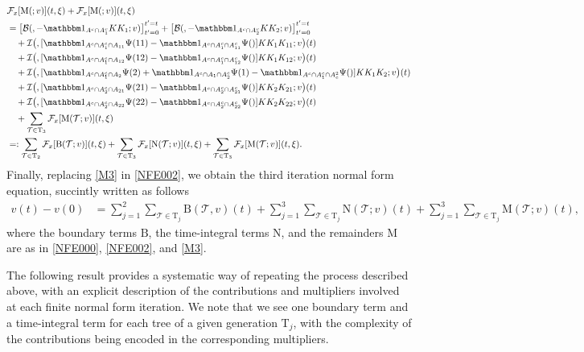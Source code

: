 \documentclass[%
11pt,  reqno]{amsart}
\makeatletter
\newcommand{\5}{\textup{V}}
\newcommand{\ind}{\mathbbm 1}
\theoremstyle{remark}
\newcommand{\TT}{\mathcal{T}}
\newcommand{\Tr}{\mathrm{T}}
\newcommand{\Ft}{{\mathcal{F}}}
\def\<#1>{\csname MH@symb@#1\endcsname}
\newcommand{\B}{\mathcal{B}}
\newcommand{\Ical}{\mathcal{I}}
\numberwithin{equation}{section}
\numberwithin{theorem}{section}
\newcommand{\MM}{\mathrm{M}}
\newcommand{\NN}{\mathrm{N}}
\newcommand{\BB}{\mathrm{B}}
\makeatother
\begin{document}
\begin{align}
&
 \Ft_x[ 
\MM(\<21>;v)
] (t, \xi) 
+
 \Ft_x[ 
\MM(\<22>;v)
] (t, \xi) 
\\
&
=
\big[ \B(\<21>, - \ind_{A^c \cap A_1^c} KK_1 ; v) \big]_{t'=0}^{t'=t}
+
\big[ \B(\<22>, - \ind_{A^c \cap A_2^c} KK_2 ; v) \big]_{t'=0}^{t'=t}
\\
&
\quad 
+ \Ical\big( \<31> ,  [\ind_{A^c\cap A_1^c \cap A_{11}} \Psi(11) - \ind_{A^c\cap A_1^c \cap A_{11}^c} \Psi(\<21>) ] KK_1 K_{11}  ; v \big)(t)
\\
&
\quad 
+
 \Ical\big( \<32> , [ \ind_{A^c\cap A_1^c \cap A_{12}} \Psi(12) - \ind_{A^c \cap A_1^c \cap A_{12}^c} \Psi(\<21>)  ]KK_1 K_{12}  ; v \big)(t)
\\
&
\quad 
+ \Ical\big( \<33> ,  [ \ind_{A^c\cap A_1^c \cap A_{2}} \Psi(2)+ \ind_{A^c \cap A_1 \cap A_2^c} \Psi(1)  - \ind_{A^c \cap A_1^c \cap A^2_c} \Psi(\<1>)] KK_1 K_2    ; v \big)(t)
\\
&
\quad 
+ \Ical\big( \<34> , [ \ind_{A^c \cap A_2^c \cap A_{21}} \Psi(21) - \ind_{A^c \cap A_2^c \cap A_{21}^c} \Psi(\<22>) ]K K_2 K_{21}  ; v \big)(t)
\\
&
\quad 
+ \Ical\big( \<35> ,[ \ind_{A^c \cap A_2^c \cap A_{22} } \Psi(22) - \ind_{A^c \cap A_2^c \cap A_{22}^c} \Psi(\<22>) ] K K_2 K_{22}    ; v \big)(t)
\\
&
\quad 
+ \sum_{\TT\in\Tr_3} 
 \Ft_x[ 
\MM(\TT;v)
] (t, \xi) 
\\
&
=: 
\sum_{\TT\in \Tr_2}  
\Ft_x[ 
\BB(\TT;v)
] (t, \xi) 
 + \sum_{\TT \in \Tr_3} 
 \Ft_x[ 
\NN(\TT;v)
] (t, \xi) 
 + \sum_{\TT\in\Tr_3} 
 \Ft_x[ 
\MM(\TT;v)
] (t, \xi) 
. 
\label{M3}
\end{align}
Finally, replacing \eqref{M3} in \eqref{NFE002}, we obtain the third iteration normal form equation, succintly written as follows
\begin{align}
v(t) - v(0)
&
= \sum_{j=1}^2 \sum_{\TT \in \Tr_j} \BB(\TT,v)(t) 
+ 
\sum_{j=1}^3 \sum_{\TT\in \Tr_j} \NN(\TT; v) (t)
+
\sum_{j=1}^3 \sum_{\TT\in \Tr_j} \MM(\TT; v) (t), 
\end{align}
where the boundary terms $\BB$, the time-integral terms $\NN$, and the remainders $\MM$ are as in \eqref{NFE000}, \eqref{NFE002}, and \eqref{M3}. 





The following result provides a systematic way of repeating the process described above, with an explicit description of the contributions and multipliers involved at each finite normal form iteration. 
We note that we see one boundary term and a time-integral term for each tree of a given generation $\Tr_j$, with the complexity of the contributions being encoded in the corresponding multipliers.
\end{document}
